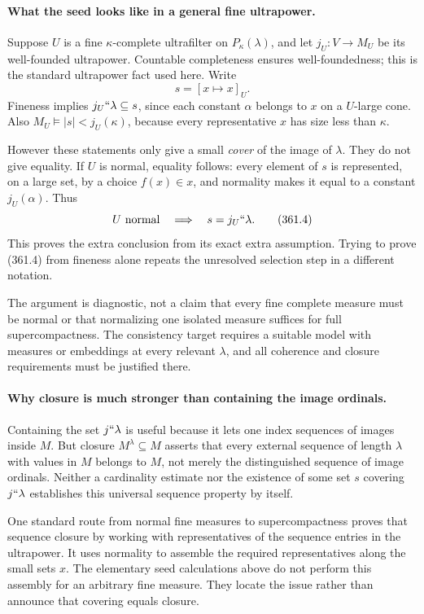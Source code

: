 \documentclass[11pt]{article}
\begin{document}
\paragraph{What the seed looks like in a general fine ultrapower.}
Suppose $U$ is a fine $\kappa$-complete ultrafilter on
$P_\kappa(\lambda)$, and let $j_U:V\to M_U$ be its well-founded
ultrapower. Countable completeness ensures well-foundedness; this is
the standard ultrapower fact used here. Write
\[
 s=[x\mapsto x]_U.
\]
Fineness implies $j_U``\lambda\subseteq s$, since each constant
$\alpha$ belongs to $x$ on a $U$-large cone. Also
$M_U\models |s|<j_U(\kappa)$, because every representative $x$
has size less than $\kappa$.

However these statements only give a small \emph{cover} of the image
of $\lambda$. They do not give equality. If $U$ is normal, equality
follows: every element of $s$ is represented, on a large set, by a
choice $f(x)\in x$, and normality makes it equal to a constant
$j_U(\alpha)$. Thus
\[
 U\text{ normal}\quad\Longrightarrow\quad s=j_U``\lambda.
 \tag{361.4}
\]
This proves the extra conclusion from its exact extra assumption.
Trying to prove (361.4) from fineness alone repeats the unresolved
selection step in a different notation.

The argument is diagnostic, not a claim that every fine complete
measure must be normal or that normalizing one isolated measure suffices
for full supercompactness. The consistency target requires a suitable
model with measures or embeddings at every relevant $\lambda$, and
all coherence and closure requirements must be justified there.

\paragraph{Why closure is much stronger than containing the image ordinals.}
Containing the set $j``\lambda$ is useful because it lets one index
sequences of images inside $M$. But closure $M^\lambda\subseteq M$
asserts that every external sequence of length $\lambda$ with values
in $M$ belongs to $M$, not merely the distinguished sequence of image
ordinals. Neither a cardinality estimate nor the existence of some
set $s$ covering $j``\lambda$ establishes this universal sequence
property by itself.

One standard route from normal fine measures to supercompactness proves
that sequence closure by working with representatives of the sequence
entries in the ultrapower. It uses normality to assemble the required
representatives along the small sets $x$. The elementary seed calculations
above do not perform this assembly for an arbitrary fine measure.
They locate the issue rather than announce that covering equals closure.
\end{document}
